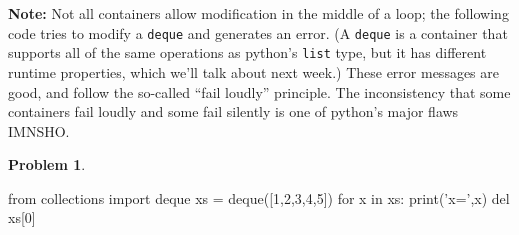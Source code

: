 \documentclass[12pt]{article}
\theoremstyle{definition}
\newtheorem{problem}{Problem}
\begin{document}
\noindent
\textbf{Note:}
Not all containers allow modification in the middle of a loop;
the following code tries to modify a \texttt{deque} and generates an error.
(A \texttt{deque} is a container that supports all of the same operations as python's \texttt{list} type,
but it has different runtime properties,
which we'll talk about next week.)
These error messages are good, and follow the so-called ``fail loudly'' principle.
The inconsistency that some containers fail loudly and some fail silently is one of python's major flaws IMNSHO.

\begin{problem}
~~~
\begin{python}
from collections import deque
xs = deque([1,2,3,4,5])
for x in xs:
    print('x=',x)
    del xs[0]
\end{python}
\end{problem}
\vspace{2in}
\end{document}
